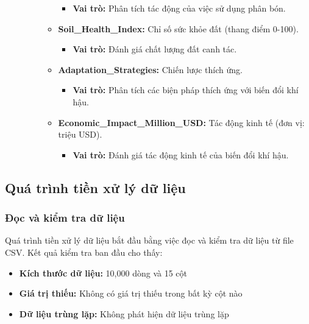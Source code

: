 \begin{description}
\begin{itemize}
\begin{itemize}
            \begin{itemize}
                \item \textbf{Vai trò:} Phân tích tác động của việc sử dụng phân bón.
            \end{itemize}
            \item \textbf{Soil\_Health\_Index:} Chỉ số sức khỏe đất (thang điểm 0-100).
            \begin{itemize}
                \item \textbf{Vai trò:} Đánh giá chất lượng đất canh tác.
            \end{itemize}
            \item \textbf{Adaptation\_Strategies:} Chiến lược thích ứng.
            \begin{itemize}
                \item \textbf{Vai trò:} Phân tích các biện pháp thích ứng với biến đổi khí hậu.
            \end{itemize}
            \item \textbf{Economic\_Impact\_Million\_USD:} Tác động kinh tế (đơn vị: triệu USD).
            \begin{itemize}
                \item \textbf{Vai trò:} Đánh giá tác động kinh tế của biến đổi khí hậu.
            \end{itemize}
        \end{itemize}
    \end{itemize}
\end{description}

\subsection{Quá trình tiền xử lý dữ liệu}

\subsubsection{Đọc và kiểm tra dữ liệu}

\hspace{0.5cm}Quá trình tiền xử lý dữ liệu bắt đầu bằng việc đọc và kiểm tra dữ liệu từ file CSV. Kết quả kiểm tra ban đầu cho thấy:

\begin{itemize}
    \item \textbf{Kích thước dữ liệu:} 10,000 dòng và 15 cột
    \item \textbf{Giá trị thiếu:} Không có giá trị thiếu trong bất kỳ cột nào
    \item \textbf{Dữ liệu trùng lặp:} Không phát hiện dữ liệu trùng lặp
\end{itemize}

